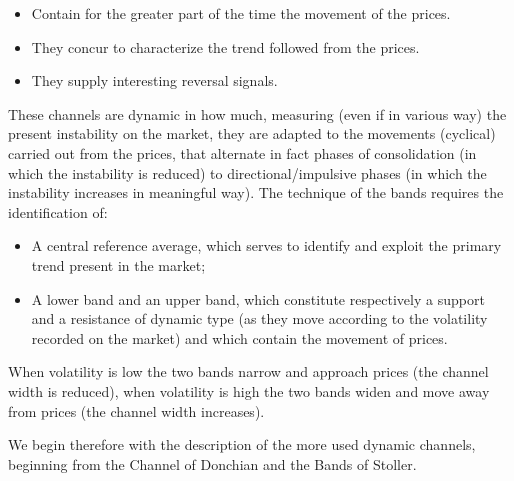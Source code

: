 \begin{itemize}
\setlength\itemsep{0.3em}
\item Contain for the greater part of the time the movement of the prices.
\item They concur to characterize the trend followed from the prices.
\item They supply interesting reversal signals.
\end{itemize}

These channels are dynamic in how much, measuring (even if in various way) the present instability on the market, they are adapted to the movements (cyclical) carried out from the prices, that alternate in fact phases of consolidation (in which the instability is reduced) to directional/impulsive phases (in which the instability increases in meaningful way). The technique of the bands requires the identification of:

\begin{itemize}
\setlength\itemsep{0.3em}
\item A central reference average, which serves to identify and exploit the primary trend present in the market;
\item A lower band and an upper band, which constitute respectively a support and a resistance of dynamic type (as they move according to the volatility recorded on the market) and which contain the movement of prices.
\end{itemize}

When volatility is low the two bands narrow and approach prices (the channel width is reduced), when volatility is high the two bands widen and move away from prices (the channel width increases). 

We begin therefore with the description of the more used dynamic channels, beginning from the Channel of Donchian and the Bands of Stoller. 

